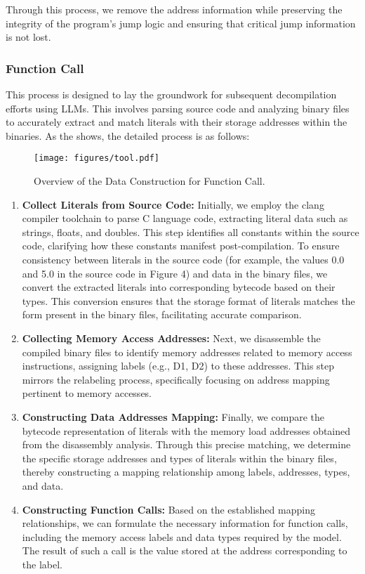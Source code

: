 Through this process, we remove the address information while preserving the integrity of the program's jump logic and ensuring that critical jump information is not lost.

\subsubsection{Function Call}

This process is designed to lay the groundwork for subsequent decompilation efforts using LLMs.
This involves parsing source code and analyzing binary files to accurately extract and match literals with their storage addresses within the binaries. 
As the  shows, the detailed process is as follows:

\begin{figure}[t]
    \centering
    \texttt{[image: figures/tool.pdf]}
    \caption{Overview of the Data Construction for Function Call. }
    \label{fig:tool}
\end{figure}

\begin{enumerate}
\item \textbf{Collect Literals from Source Code:}
Initially, we employ the clang compiler toolchain to parse C language code, extracting literal data such as strings, floats, and doubles. This step identifies all constants within the source code, clarifying how these constants manifest post-compilation. To ensure consistency between literals in the source code (for example, the values 0.0 and 5.0 in the source code in Figure 4) and data in the binary files, we convert the extracted literals into corresponding bytecode based on their types. This conversion ensures that the storage format of literals matches the form present in the binary files, facilitating accurate comparison.

\item \textbf{Collecting Memory Access Addresses:}
Next, we disassemble the compiled binary files to identify memory addresses related to memory access instructions, assigning labels (e.g., D1, D2) to these addresses. This step mirrors the relabeling process, specifically focusing on address mapping pertinent to memory accesses.

\item \textbf{Constructing Data Addresses Mapping:}
Finally, we compare the bytecode representation of literals with the memory load addresses obtained from the disassembly analysis. Through this precise matching, we determine the specific storage addresses and types of literals within the binary files, thereby constructing a mapping relationship among labels, addresses, types, and data.

\item \textbf{Constructing Function Calls:}
Based on the established mapping relationships, we can formulate the necessary information for function calls, including the memory access labels and data types required by the model. The result of such a call is the value stored at the address corresponding to the label.
\end{enumerate}

